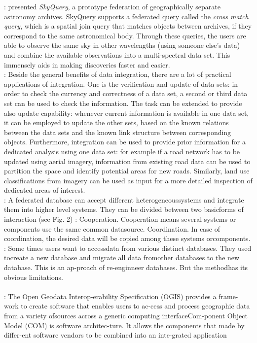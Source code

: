 \documentclass[12pt,a4paper]{report}
\newcommand{\term}{\textit}
\begin{document}
	\citet{Malik}: presented \term{SkyQuery}, a prototype federation of geographically separate astronomy archives. SkyQuery supports a federated query called the \term{cross match query}, which is a spatial join query that matches objects between archives, if they correspond to the same astronomical body. Through these queries, the users are able to observe the same sky in other wavelengths (using someone else’s data) and combine the available observations into a multi-spectral data set. This immensely aids in making discoveries faster and easier.
	\\

	\citep{Butenuth}: Beside the general benefits of data integration, there are a lot of practical applications of integration. One is the verification and update of data sets: in order to check the currency and correctness of a data set, a second or third data set can be used to check the information. The task can be extended to provide also update capability: whenever current information is available in one data set, it can be employed to update the other sets, based on the known relations between the data sets and the known link structure between corresponding objects. Furthermore, integration can be used to provide prior information for a dedicated analysis using one data set: for example if a road network has to be updated using aerial imagery, information from existing road data can be used to partition the space and identify potential areas for new roads. Similarly, land use classifications from imagery can be used as input for a more detailed inspection of dedicated areas of interest. 
	\\

	\citep{Jian}: A federated database can accept different heterogeneoussystems and integrate them into higher level systems. They can be divided between two basicforms of interaction (see Fig. 2) : Cooperation. Cooperation means several systems or components use the same common datasource. Coordination. In case of coordination, the desired data will be copied among these systems orcomponents.
	\\

	\citep{Jian}: Some times users want to accessdata from various distinct databases. They used tocreate a new database and migrate all data fromother databases to the new database. This is an ap-proach of re-enginneer databases. But the methodhas its obvious limitations.
	\\\\
	\citep{Jian}: The Open Geodata Interop-erability Specification (OGIS) provides a frame-work to create software that enables users to ac-cess and process geographic data from a variety ofsources across a generic computing interfaceCom-ponent Object Model (COM) is software architec-ture. It allows the components that made by differ-ent software vendors to be combined into an inte-grated application
	\\
\end{document}
